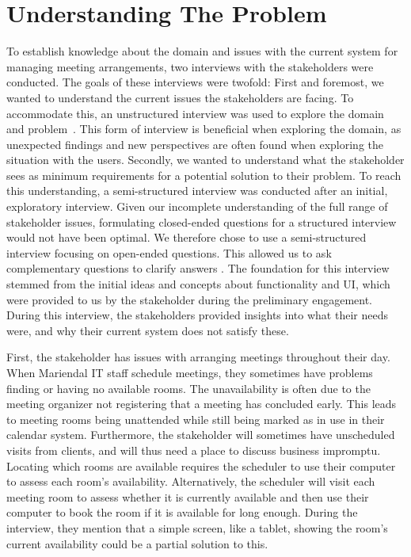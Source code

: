 \section{Understanding The Problem}\label{sec:understanding_the_problem} %
To establish knowledge about the domain and issues with the current system for managing meeting arrangements, two interviews with the stakeholders were conducted. 
The goals of these interviews were twofold: 
First and foremost, we wanted to understand the current issues the stakeholders are facing. 
To accommodate this, an unstructured interview was used to explore the domain and problem~\cite{benyon2013designing}. 
This form of interview is beneficial when exploring the domain, as unexpected findings and new perspectives are often found when exploring the situation with the users\cite{benyon2013designing}.
Secondly, we wanted to understand what the stakeholder sees as minimum requirements for a potential solution to their problem. 
To reach this understanding, a semi-structured interview was conducted after an initial, exploratory interview.
Given our incomplete understanding of the full range of stakeholder issues, formulating closed-ended questions for a structured interview would not have been optimal.
We therefore chose to use a semi-structured interview focusing on open-ended questions. This allowed us to ask complementary questions to clarify answers \cite{InterviewsNHS}.
The foundation for this interview stemmed from the initial ideas and concepts about functionality and UI, which were provided to us by the stakeholder during the preliminary engagement.
During this interview, the stakeholders provided insights into what their needs were, and why their current system does not satisfy these.

First, the stakeholder has issues with arranging meetings throughout their day.
When Mariendal IT staff schedule meetings, they sometimes have problems finding or having no available rooms.
The unavailability is often due to the meeting organizer not registering that a meeting has concluded early.
This leads to meeting rooms being unattended while still being marked as in use in their calendar system.
Furthermore, the stakeholder will sometimes have unscheduled visits from clients, and will thus need a place to discuss business impromptu. 
Locating which rooms are available requires the scheduler to use their computer to assess each room's availability.
Alternatively, the scheduler will visit each meeting room to assess whether it is currently available and then use their computer to book the room if it is available for long enough.
During the interview, they mention that a simple screen, like a tablet, showing the room's current availability could be a partial solution to this.

